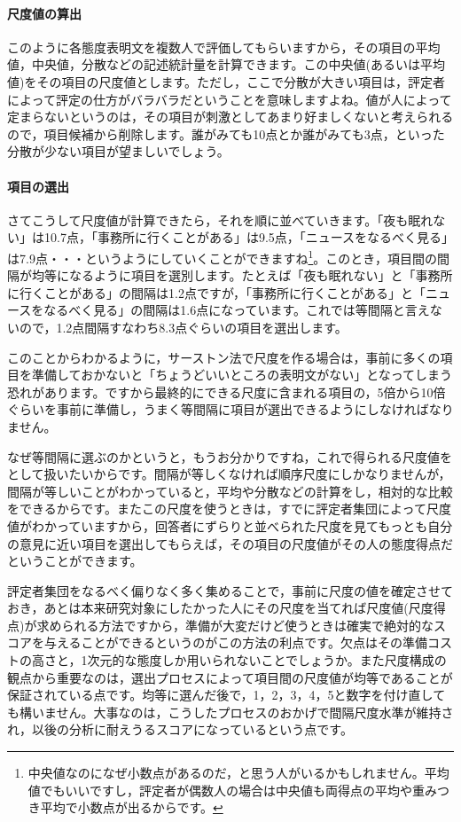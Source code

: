 \documentclass{ltjsbook}
\begin{document}
\paragraph{尺度値の算出}このように各態度表明文を複数人で評価してもらいますから，その項目の平均値，中央値，分散などの記述統計量を計算できます。この中央値(あるいは平均値)をその項目の尺度値とします。ただし，ここで分散が大きい項目は，評定者によって評定の仕方がバラバラだということを意味しますよね。値が人によって定まらないというのは，その項目が刺激としてあまり好ましくないと考えられるので，項目候補から削除します。誰がみても10点とか誰がみても3点，といった分散が少ない項目が望ましいでしょう。

\paragraph{項目の選出}さてこうして尺度値が計算できたら，それを順に並べていきます。「夜も眠れない」は10.7点，「事務所に行くことがある」は9.5点，「ニュースをなるべく見る」は7.9点・・・というようにしていくことができますね\footnote{中央値なのになぜ小数点があるのだ，と思う人がいるかもしれません。平均値でもいいですし，評定者が偶数人の場合は中央値も両得点の平均や重みつき平均で小数点が出るからです。}。このとき，項目間の間隔が均等になるように項目を選別します。たとえば「夜も眠れない」と「事務所に行くことがある」の間隔は1.2点ですが，「事務所に行くことがある」と「ニュースをなるべく見る」の間隔は1.6点になっています。これでは等間隔と言えないので，1.2点間隔すなわち8.3点ぐらいの項目を選出します。

このことからわかるように，サーストン法で尺度を作る場合は，事前に多くの項目を準備しておかないと「ちょうどいいところの表明文がない」となってしまう恐れがあります。ですから最終的にできる尺度に含まれる項目の，5倍から10倍ぐらいを事前に準備し，うまく等間隔に項目が選出できるようにしなければなりません。

なぜ等間隔に選ぶのかというと，もうお分かりですね，これで得られる尺度値をとして扱いたいからです。間隔が等しくなければ順序尺度にしかなりませんが，間隔が等しいことがわかっていると，平均や分散などの計算をし，相対的な比較をできるからです。またこの尺度を使うときは，すでに評定者集団によって尺度値がわかっていますから，回答者にずらりと並べられた尺度を見てもっとも自分の意見に近い項目を選出してもらえば，その項目の尺度値がその人の態度得点だということができます。

評定者集団をなるべく偏りなく多く集めることで，事前に尺度の値を確定させておき，あとは本来研究対象にしたかった人にその尺度を当てれば尺度値(尺度得点)が求められる方法ですから，準備が大変だけど使うときは確実で絶対的なスコアを与えることができるというのがこの方法の利点です。欠点はその準備コストの高さと，1次元的な態度しか用いられないことでしょうか。また尺度構成の観点から重要なのは，選出プロセスによって項目間の尺度値が均等であることが保証されている点です。均等に選んだ後で，1，2，3，4，5と数字を付け直しても構いません。大事なのは，こうしたプロセスのおかげで間隔尺度水準が維持され，以後の分析に耐えうるスコアになっているという点です。
\end{document}
